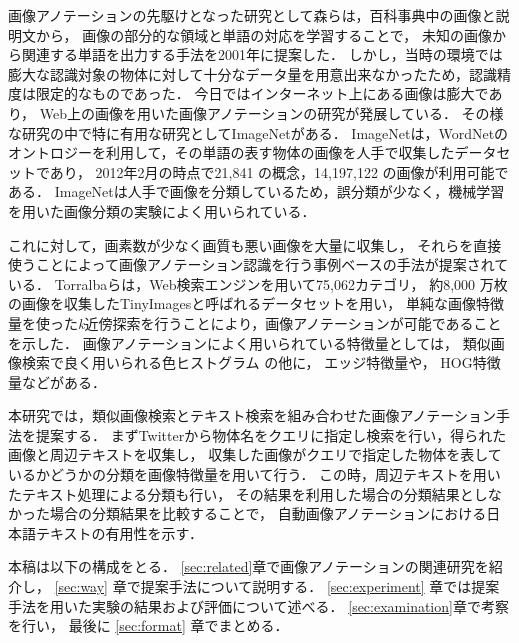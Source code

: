 画像アノテーションの先駆けとなった研究として森ら\cite{mori}は，百科事典中の画像と説明文から，
画像の部分的な領域と単語の対応を学習することで，
未知の画像から関連する単語を出力する手法を2001年に提案した．
しかし，当時の環境では膨大な認識対象の物体に対して十分なデータ量を用意出来なかったため，認識精度は限定的なものであった．
今日ではインターネット上にある画像は膨大であり，
Web上の画像を用いた画像アノテーションの研究が発展している．
その様な研究の中で特に有用な研究としてImageNet\cite{imagenet}がある．
ImageNet\cite{imagenet}は，WordNetのオントロジーを利用して，その単語の表す物体の画像を人手で収集したデータセットであり，
2012年2月の時点で21,841 の概念，14,197,122 の画像が利用可能である．
ImageNetは人手で画像を分類しているため，誤分類が少なく，機械学習を用いた画像分類の実験によく用いられている． 

これに対して，画素数が少なく画質も悪い画像を大量に収集し，
それらを直接使うことによって画像アノテーション認識を行う事例ベースの手法が提案されている．
Torralba\cite{torralba}らは，Web検索エンジンを用いて75,062カテゴリ，
約8,000 万枚の画像を収集したTinyImagesと呼ばれるデータセットを用い，
単純な画像特徴量を使った{\it k}近傍探索を行うことにより，画像アノテーションが可能であることを示した．
%
%
%
画像アノテーションによく用いられている特徴量としては，
類似画像検索で良く用いられる色ヒストグラム
の他に，
エッジ特徴量や，
HOG特徴量\cite{dalal}などがある．

本研究では，類似画像検索とテキスト検索を組み合わせた画像アノテーション手法を提案する．
まずTwitterから物体名をクエリに指定し検索を行い，得られた画像と周辺テキストを収集し，
収集した画像がクエリで指定した物体を表しているかどうかの分類を画像特徴量を用いて行う．
この時，周辺テキストを用いたテキスト処理による分類も行い，
その結果を利用した場合の分類結果としなかった場合の分類結果を比較することで，
自動画像アノテーションにおける日本語テキストの有用性を示す．


本稿は以下の構成をとる．
\ref{sec:related}章で画像アノテーションの関連研究を紹介し，
\ref{sec:way}
章で提案手法について説明する．
\ref{sec:experiment}
章では提案手法を用いた実験の結果および評価について述べる．
\ref{sec:examination}章で考察を行い，
最後に
\ref{sec:format}
章でまとめる．

